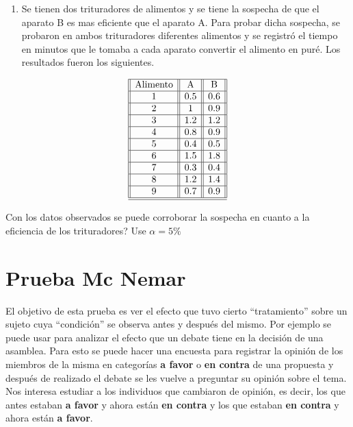 \documentclass[
  a4paper,
  oneside,
  openany]{book}
\providecommand{\tightlist}{%
  \setlength{\itemsep}{0pt}\setlength{\parskip}{0pt}}
\begin{document}
\begin{enumerate}
\def\labelenumi{\arabic{enumi}.}
\setcounter{enumi}{2}
\tightlist
\item
  Se tienen dos trituradores de alimentos y se tiene la sospecha de que el aparato B es mas eficiente que el aparato A. Para probar dicha sospecha, se probaron en ambos trituradores diferentes alimentos y se registró el tiempo en minutos que le tomaba a cada aparato convertir el alimento en puré. Los resultados fueron los siguientes.
\end{enumerate}

\[
\begin{array}{||c| |c| |c| |c|} 
\hline 
\mbox{Alimento} & \mbox{A} & \mbox{B}\\
 \hline
1&0.5&0.6\\
 \hline
2&1&0.9\\
 \hline
3&1.2&1.2\\
 \hline
4&0.8&0.9\\
 \hline
5&0.4&0.5\\
 \hline
6&1.5&1.8\\
 \hline
7&0.3&0.4\\
 \hline
8&1.2&1.4\\
 \hline
9&0.7&0.9\\
\hline
\hline
\end{array}
\]

Con los datos observados se puede corroborar la sospecha en cuanto a la eficiencia de los trituradores? Use \(\alpha=5\%\)

\hypertarget{prueba-mc-nemar}{%
\chapter{Prueba Mc Nemar}\label{prueba-mc-nemar}}

El objetivo de esta prueba es ver el efecto que tuvo cierto ``tratamiento'' sobre un sujeto cuya ``condición'' se observa antes y después del mismo.
Por ejemplo se puede usar para analizar el efecto que un debate tiene en la decisión de una asamblea. Para esto se puede hacer una encuesta para registrar la opinión de los miembros de la misma en categorías \textbf{a favor} o \textbf{en contra} de una propuesta y después de realizado el debate se les vuelve a preguntar su opinión sobre el tema.
Nos interesa estudiar a los individuos que cambiaron de opinión, es decir, los que antes estaban \textbf{a favor} y ahora están \textbf{en contra} y los que estaban \textbf{en contra} y ahora están \textbf{a favor}.
\end{document}
